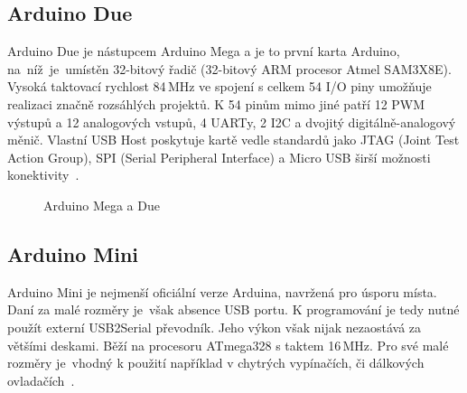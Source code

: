 		\subsection{Arduino Due} 
		Arduino Due je nástupcem Arduino Mega a je to první karta Arduino, na~níž~je~umístěn 32-bitový řadič (32-bitový ARM procesor
		Atmel SAM3X8E). Vysoká taktovací rychlost 84\,MHz ve spojení s celkem 54 I/O piny umožňuje realizaci značně rozsáhlých projektů. K 54 pinům mimo jiné patří 12 PWM výstupů a 12 analogových vstupů, 4 UARTy, 2 I2C a dvojitý digitálně-analogový měnič. Vlastní USB Host poskytuje kartě vedle standardů jako JTAG (Joint Test Action Group), SPI (Serial Peripheral Interface) a Micro USB širší možnosti konektivity~\cite{ArduinoDue}.	

\begin{figure}[!ht]
    \centering
			\hspace*{5mm}
		\caption{Arduino Mega a Due}
		\vspace{-20pt}	
\end{figure}


	\subsection{Arduino Mini} 
	Arduino Mini je nejmenší oficiální verze Arduina, navržená pro úsporu místa. Daní za malé rozměry je~však absence USB portu. K programování je tedy nutné použít externí USB2Serial převodník. Jeho výkon však nijak nezaostává za většími deskami. Běží na procesoru ATmega328 s taktem 16\,MHz. Pro své malé rozměry je~vhodný k použití například v chytrých vypínačích, či dálkových ovladačích~\cite{ArduinoMini}.	
	
